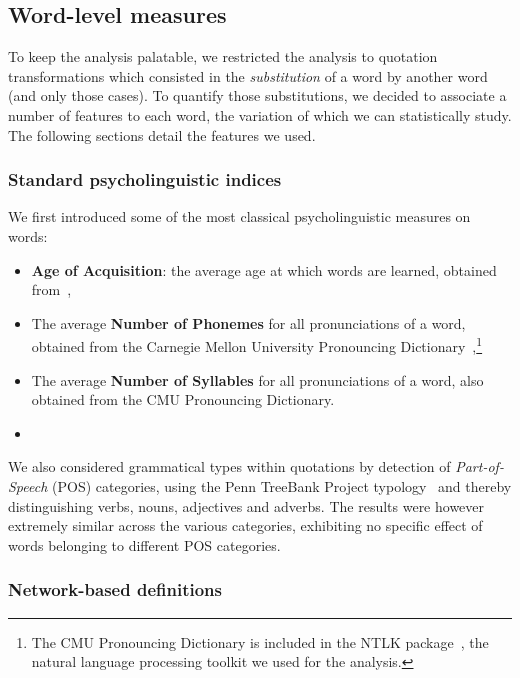 \subsection{Word-level measures}

To keep the analysis palatable, we restricted the analysis to quotation transformations which consisted in the \emph{substitution} of a word by another word (and only those cases).
To quantify those substitutions, we decided to associate a number of features to each word, the variation of which we can statistically study.
The following sections detail the features we used.

\subsubsection{Standard psycholinguistic indices}

We first introduced some of the most classical psycholinguistic measures on words:

\begin{itemize}
    \item \textbf{Age of Acquisition}: the average age at which words are learned, obtained from~\citet{kuperman12},
    \item The average \textbf{Number of Phonemes} for all pronunciations of a word, obtained from the Carnegie Mellon University Pronouncing Dictionary~\citep{Weide98},\footnote{The CMU Pronouncing Dictionary is included in the NTLK package~\citep{Bird09}, the natural language processing toolkit we used for the analysis.}
    \item The average \textbf{Number of Syllables} for all pronunciations of a word, also obtained from the CMU Pronouncing Dictionary.
    \item {}
\end{itemize}

We also considered grammatical types within quotations by detection of \emph{Part-of-Speech} (POS) categories, using the Penn TreeBank Project typology~\citep{Santorini90} and thereby distinguishing verbs, nouns, adjectives and adverbs.
The results were however extremely similar across the various categories, exhibiting no specific effect of words belonging to different POS categories.

\subsubsection{Network-based definitions}

